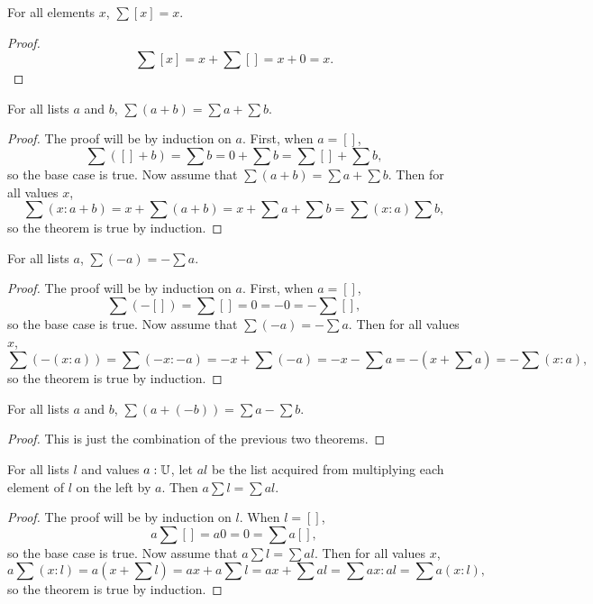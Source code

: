 \documentclass[../../math.tex]{subfiles}
\begin{document}
\begin{theorem}
    For all elements $x$, $\sum [x] = x$.
\end{theorem}
\begin{proof}
    \[
        \sum [x] = x + \sum [] = x + 0 = x.
    \]
\end{proof}

\begin{theorem} \label{list_sum_conc}
    For all lists $a$ and $b$, $\sum (a + b) = \sum a + \sum b$.
\end{theorem}
\begin{proof}
    The proof will be by induction on $a$.  First, when $a = []$,
    \[
        \sum ([] + b) = \sum b = 0 + \sum b = \sum [] + \sum b,
    \]
    so the base case is true.  Now assume that $\sum (a + b) = \sum a + \sum b.$
    Then for all values $x$,
    \[
        \sum(x : a + b) = x + \sum(a + b) = x + \sum a + \sum b = \sum (x : a)
        \sum b,
    \]
    so the theorem is true by induction.
\end{proof}

\begin{theorem} \label{list_sum_neg}
    For all lists $a$, $\sum (-a) = -\sum a$.
\end{theorem}
\begin{proof}
    The proof will be by induction on $a$.  First, when $a = []$,
    \[
        \sum (-[]) = \sum [] = 0 = -0 = -\sum [],
    \]
    so the base case is true.  Now assume that $\sum (-a) = -\sum a$.  Then for
    all values $x$,
    \[
        \sum (-(x : a)) = \sum(-x : -a) = -x + \sum (-a) = -x - \sum a = -(x +
        \sum a) = -\sum (x : a),
    \]
    so the theorem is true by induction.
\end{proof}

\begin{theorem} \label{list_sum_minus}
    For all lists $a$ and $b$, $\sum (a + (-b)) = \sum a - \sum b$.
\end{theorem}
\begin{proof}
    This is just the combination of the previous two theorems.
\end{proof}

\begin{theorem} \label{list_sum_lmult}
    For all lists $l$ and values $a : \mathbb{U}$, let $al$ be the list acquired from
    multiplying each element of $l$ on the left by $a$.  Then $a \sum l = \sum
    al$.
\end{theorem}
\begin{proof}
    The proof will be by induction on $l$.  When $l = []$,
    \[
        a \sum [] = a0 = 0 = \sum a[],
    \]
    so the base case is true.  Now assume that $a \sum l = \sum al$.  Then for
    all values $x$,
    \[
        a \sum (x : l)
        = a\left( x + \sum l \right)
        = ax + a \sum l
        = ax + \sum al
        = \sum ax : al
        = \sum a(x : l),
    \]
    so the theorem is true by induction.
\end{proof}
\end{document}
